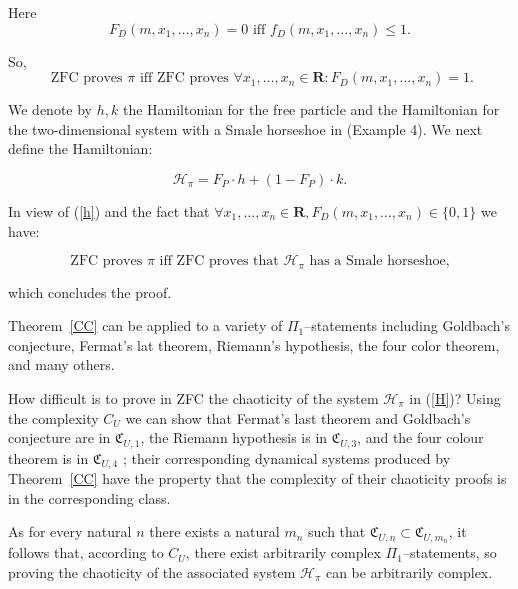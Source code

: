 \documentclass[
aip,
cha,
amssymb
]{revtex4-1}
\def \C{{\mathfrak C}}
\def \R{{\mathbf R}}
\begin{document}
\noindent Here
$$F_{D}(m,x_{1}, \ldots ,x_{n}) = 0 \mbox{ iff }  f_{D}(m,x_{1}, \ldots ,x_{n}) \le 1.$$


So,
\begin{equation}
\label{h}
\mbox{ ZFC   proves  }  \pi \mbox{  iff   ZFC proves  }   \forall  x_{1}, \ldots ,x_{n} \in\R:  F_{D}(m,x_{1}, \ldots ,x_{n})=1.
\end{equation}



We denote by $h,k$
the Hamiltonian for the free particle and the Hamiltonian for the two-dimensional
system with a Smale horseshoe in \cite{Homes-Marsden-82} (Example 4).  We next define
the Hamiltonian:


\begin{equation}
\label{H}
\mathcal{H}_{\pi} = F_{P} \cdot h + (1- F_{P})\cdot k.
\end{equation}


In view of (\ref{h}) and the fact that $ \forall  x_{1}, \ldots ,x_{n} \in\R,  F_{D}(m,x_{1}, \ldots ,x_{n})
\in\{0,1\}$ we have:


\[ \mbox{  ZFC proves  }  \pi \mbox{  iff  ZFC proves  that } \mathcal{H}_{\pi} \mbox{   has a Smale horseshoe, }\]

\noindent which concludes the proof.



Theorem~\ref{CC} can be applied to a variety of $\Pi_{1}$--statements including Goldbach's conjecture,
Fermat's lat theorem, Riemann's hypothesis, the four color theorem, and many others.


How difficult is to prove in ZFC the chaoticity of the system $\mathcal{H}_{\pi}$ in (\ref{H})?
Using the
complexity $C_{U}$ we can show that Fermat's last theorem and Goldbach's conjecture are in $\C_{U,1}$,   the Riemann hypothesis is in
   $\C_{U,3}$, and the four colour theorem is in $\C_{U,4}$ \cite{calude-elena-ec2,calude-elena-CE3,ecalude-09}; their corresponding
   dynamical systems produced by Theorem~\ref{CC} have the property that the complexity of their chaoticity proofs is in the corresponding class.



As for every natural $n$ there exists a natural $m_{n}$ such that $\C_{U,n} \subset \C_{U,m_{n}}$, it follows that,
according to $C_{U}$, there exist arbitrarily complex $\Pi_{1}$--statements, so proving the chaoticity
of the associated system $\mathcal{H}_{\pi}$ can be arbitrarily complex.
\end{document}
